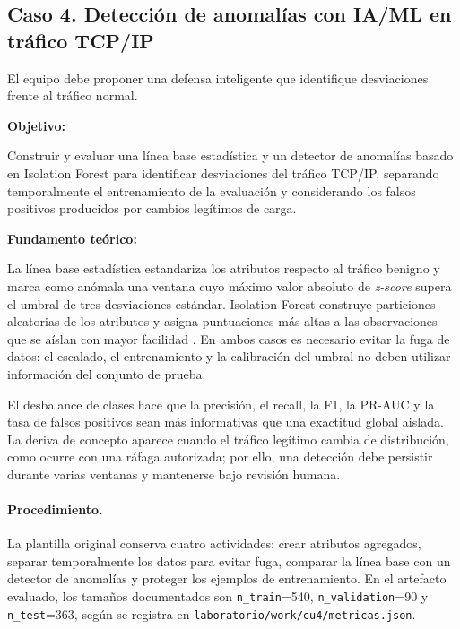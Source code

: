 \subsection{Caso 4. Detección de anomalías con IA/ML en tráfico TCP/IP}
\label{caso:anomalias-ml}

\begin{situacion}
El equipo debe proponer una defensa inteligente que identifique desviaciones frente al tráfico normal.

\textbf{Objetivo:} \par
Construir y evaluar una línea base estadística y un detector de anomalías basado en Isolation Forest para identificar desviaciones del tráfico TCP/IP, separando temporalmente el entrenamiento de la evaluación y considerando los falsos positivos producidos por cambios legítimos de carga. \par

\textbf{Fundamento teórico:} \par
La línea base estadística estandariza los atributos respecto al tráfico benigno y marca como anómala una ventana cuyo máximo valor absoluto de \textit{z-score} supera el umbral de tres desviaciones estándar. Isolation Forest construye particiones aleatorias de los atributos y asigna puntuaciones más altas a las observaciones que se aíslan con mayor facilidad \parencite{liu2008isolation,sklearn}. En ambos casos es necesario evitar la fuga de datos: el escalado, el entrenamiento y la calibración del umbral no deben utilizar información del conjunto de prueba.

El desbalance de clases hace que la precisión, el recall, la F1, la PR-AUC y la tasa de falsos positivos sean más informativas que una exactitud global aislada. La deriva de concepto aparece cuando el tráfico legítimo cambia de distribución, como ocurre con una ráfaga autorizada; por ello, una detección debe persistir durante varias ventanas y mantenerse bajo revisión humana.
\end{situacion}

\paragraph{Procedimiento.}
La plantilla original conserva cuatro actividades: crear atributos agregados, separar temporalmente los datos para evitar fuga, comparar la línea base con un detector de anomalías y proteger los ejemplos de entrenamiento. En el artefacto evaluado, los tamaños documentados son \texttt{n\_train}=540, \texttt{n\_validation}=90 y \texttt{n\_test}=363, según se registra en \texttt{laboratorio/work/cu4/metricas.json}.

